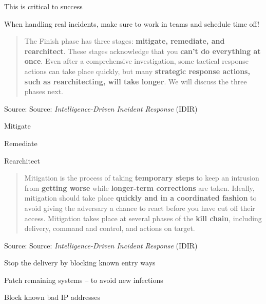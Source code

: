\documentclass[Screen16to9,17pt]{foils}
\begin{document}
\begin{list2}
\item This is critical to success
\item When handling real incidents, make sure to work in teams and schedule time off!
\end{list2}




\begin{quote}
The Finish phase has three stages: {\bf mitigate, remediate, and rearchitect}. These stages acknowledge that you {\bf can’t do everything at once}. Even after a comprehensive investigation, some tactical response actions can take place quickly, but many {\bf strategic response actions, such as rearchitecting, will take longer}. We will discuss the three phases next.
\end{quote}
Source: Source: \emph{Intelligence-Driven Incident Response} (IDIR)

\begin{list2}
\item Mitigate
\item Remediate
\item Rearchitect
\end{list2}



\begin{quote}
Mitigation is the process of taking {\bf temporary steps} to keep an intrusion from {\bf getting worse} while {\bf longer-term corrections} are taken. Ideally, mitigation should take place {\bf quickly and in a coordinated fashion} to avoid giving the adversary a chance to react before you have cut off their access. Mitigation takes place at several phases of the {\bf kill chain}, including delivery, command and control, and actions on target.
\end{quote}
Source: Source: \emph{Intelligence-Driven Incident Response} (IDIR)

\begin{list2}
\item Stop the delivery by blocking known entry ways
\item Patch remaining systems -- to avoid new infections
\item Block known bad IP addresses
\end{list2}


\end{document}
